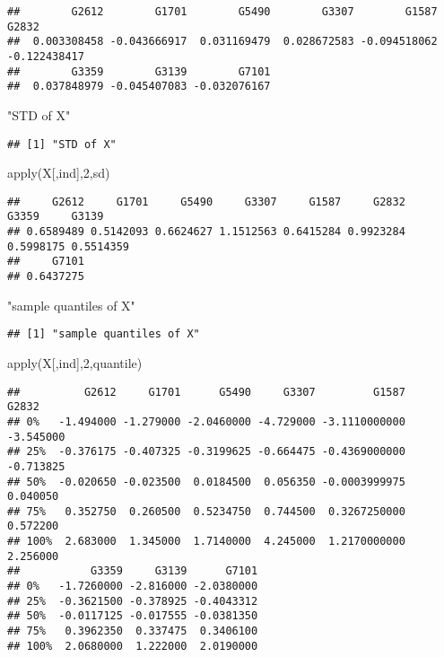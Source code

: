 \documentclass[
]{article}
\newenvironment{Shaded}{\begin{snugshade}}{\end{snugshade}}
\newcommand{\DecValTok}[1]{\textcolor[rgb]{0.00,0.00,0.81}{#1}}
\newcommand{\FunctionTok}[1]{\textcolor[rgb]{0.00,0.00,0.00}{#1}}
\newcommand{\NormalTok}[1]{#1}
\newcommand{\StringTok}[1]{\textcolor[rgb]{0.31,0.60,0.02}{#1}}
\begin{document}
\begin{verbatim}
##        G2612        G1701        G5490        G3307        G1587        G2832 
##  0.003308458 -0.043666917  0.031169479  0.028672583 -0.094518062 -0.122438417 
##        G3359        G3139        G7101 
##  0.037848979 -0.045407083 -0.032076167
\end{verbatim}

\begin{Shaded}
\begin{Highlighting}[]
\StringTok{"STD of X"}
\end{Highlighting}
\end{Shaded}

\begin{verbatim}
## [1] "STD of X"
\end{verbatim}

\begin{Shaded}
\begin{Highlighting}[]
\FunctionTok{apply}\NormalTok{(X[,ind],}\DecValTok{2}\NormalTok{,sd)}
\end{Highlighting}
\end{Shaded}

\begin{verbatim}
##     G2612     G1701     G5490     G3307     G1587     G2832     G3359     G3139 
## 0.6589489 0.5142093 0.6624627 1.1512563 0.6415284 0.9923284 0.5998175 0.5514359 
##     G7101 
## 0.6437275
\end{verbatim}

\begin{Shaded}
\begin{Highlighting}[]
\StringTok{"sample quantiles of X"}
\end{Highlighting}
\end{Shaded}

\begin{verbatim}
## [1] "sample quantiles of X"
\end{verbatim}

\begin{Shaded}
\begin{Highlighting}[]
\FunctionTok{apply}\NormalTok{(X[,ind],}\DecValTok{2}\NormalTok{,quantile)}
\end{Highlighting}
\end{Shaded}

\begin{verbatim}
##          G2612     G1701      G5490     G3307         G1587     G2832
## 0%   -1.494000 -1.279000 -2.0460000 -4.729000 -3.1110000000 -3.545000
## 25%  -0.376175 -0.407325 -0.3199625 -0.664475 -0.4369000000 -0.713825
## 50%  -0.020650 -0.023500  0.0184500  0.056350 -0.0003999975  0.040050
## 75%   0.352750  0.260500  0.5234750  0.744500  0.3267250000  0.572200
## 100%  2.683000  1.345000  1.7140000  4.245000  1.2170000000  2.256000
##           G3359     G3139      G7101
## 0%   -1.7260000 -2.816000 -2.0380000
## 25%  -0.3621500 -0.378925 -0.4043312
## 50%  -0.0117125 -0.017555 -0.0381350
## 75%   0.3962350  0.337475  0.3406100
## 100%  2.0680000  1.222000  2.0190000
\end{verbatim}
\end{document}
